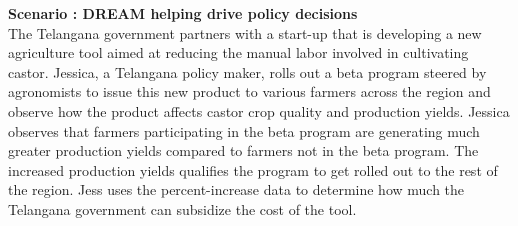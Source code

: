 \begin{flushleft}
\textbf{Scenario : DREAM helping drive policy decisions}\\\smallskip
The Telangana government partners with a start-up that is developing a new agriculture tool aimed at reducing the manual labor involved in cultivating castor. Jessica, a Telangana policy maker, rolls out a beta program steered by agronomists to issue this new product to various farmers across the region and observe how the product affects castor crop quality and production yields. Jessica observes that farmers participating in the beta program are generating much greater production yields compared to farmers not in the beta program. The increased production yields qualifies the program to get rolled out to the rest of the region. Jess uses the percent-increase data to determine how much the Telangana government can subsidize the cost of the tool. 
\end{flushleft}
